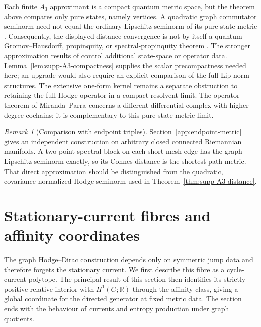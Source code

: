 \documentclass[11pt]{article}
\theoremstyle{definition}
\theoremstyle{remark}
\newtheorem{remark}[remark]{Remark}
\theoremstyle{definition}
\theoremstyle{remark}
\begin{document}
Each finite $A_3$ approximant is a compact quantum metric space, but the theorem
above compares only pure states, namely vertices.  A quadratic graph commutator
seminorm need not equal the ordinary Lipschitz seminorm of its pure-state metric
\cite{Rieffel1999}.  Consequently, the displayed distance convergence is not by
itself a quantum Gromov--Hausdorff, propinquity, or spectral-propinquity theorem
\cite{Rieffel2004,Latremoliere2022,FarsiLatremolierePacker2024}.
The stronger approximation results of
\cite{LandryLapidusLatremoliere2021,vanSuijlekom2021} control additional state-space
or operator data.  Lemma~\ref{lem:supp-A3-compactness} supplies the scalar
precompactness needed here; an upgrade would also require an explicit comparison
of the full Lip-norm structures.  The extensive one-form kernel remains a
separate obstruction to retaining the full Hodge operator in a compact-resolvent
limit.  The operator theorem of Miranda--Parra \cite{MirandaParra2023}
concerns a different differential complex with higher-degree cochains;
it is complementary to this pure-state metric limit.

\begin{remark}[Comparison with endpoint triples]
\label{subsec:endpoint-pointer}
Section~\ref{app:endpoint-metric} gives an independent construction on
arbitrary closed connected Riemannian manifolds.  A two-point spectral block
on each short mesh edge has the graph Lipschitz seminorm exactly, so its
Connes distance is the shortest-path metric.  That direct approximation
should be distinguished from the quadratic, covariance-normalized Hodge
seminorm used in Theorem~\ref{thm:supp-A3-distance}.
\end{remark}

\section{Stationary-current fibres and affinity coordinates}
\label{sec:inverse}

The graph Hodge--Dirac construction depends only on symmetric jump data and
therefore forgets the stationary current.  We first describe this fibre as a
cycle-current polytope.  The principal result of this section then identifies
its strictly positive relative interior with $H^1(G;\mathbb R)$ through the
affinity class, giving a global coordinate for the directed generator at
fixed metric data.  The section ends with the behaviour of currents and
entropy production under graph quotients.
\end{document}
